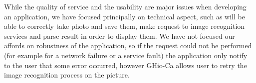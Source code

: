 While the quality of service and the usability are major issues when developing 
an application, we have focused principally on technical aspect, such as will be 
able to correctly take photo and save them, make request to image recognition 
services and parse result in order to display them. We have not focused our 
affords on robustness of the application, so if the request could not be 
performed (for example for a network failure or a service fault) the application 
only notify to the user that some error occurred, however GHio-Ca allows user to 
retry the image recognition process on the picture.






